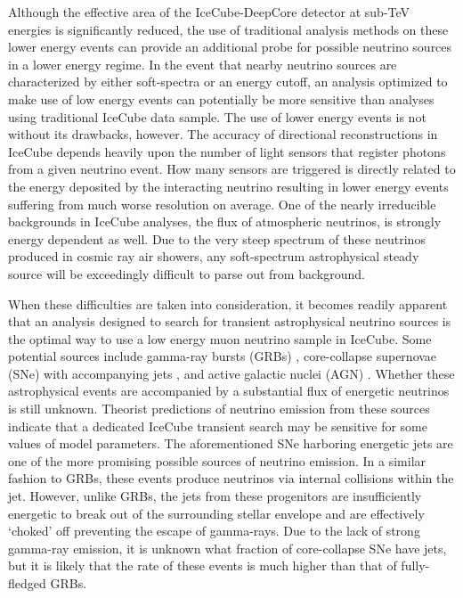 \documentclass{gatech-thesis}
\begin{document}
Although the effective area of the IceCube-DeepCore detector at sub-TeV energies is significantly reduced, the use of traditional analysis methods on these lower energy events can provide an additional probe for possible neutrino sources in a lower energy regime. In the event that nearby neutrino sources are characterized by either soft-spectra or an energy cutoff, an analysis optimized to make use of low energy events can potentially be more sensitive than analyses using traditional IceCube data sample. The use of lower energy events is not without its drawbacks, however. The accuracy of directional reconstructions in IceCube depends heavily upon the number of light sensors that register photons from a given neutrino event. How many sensors are triggered is directly related to the energy deposited by the interacting neutrino resulting in lower energy events suffering from much worse resolution on average. One of the nearly irreducible backgrounds in IceCube analyses, the flux of atmospheric neutrinos, is strongly energy dependent as well. Due to the very steep spectrum of these neutrinos produced in cosmic ray air showers, any soft-spectrum astrophysical steady source will be exceedingly difficult to parse out from background.

When these difficulties are taken into consideration, it becomes readily apparent that an analysis designed to search for transient astrophysical neutrino sources is the optimal way to use a low energy muon neutrino sample in IceCube. Some potential sources include gamma-ray bursts (GRBs) \cite{2014arXiv1410.0679K}, core-collapse supernovae (SNe) with accompanying jets \cite{2004PhRvL..93r1101R}, and active galactic nuclei (AGN) \cite{2009APh....31..138B}. Whether these astrophysical events are accompanied by a substantial flux of energetic neutrinos is still unknown. Theorist predictions of neutrino emission from these sources indicate that a dedicated IceCube transient search may be sensitive for some values of model parameters. The aforementioned SNe harboring energetic jets are one of the more promising possible sources of neutrino emission. In a similar fashion to GRBs, these events produce neutrinos via internal collisions within the jet. However, unlike GRBs, the jets from these progenitors are insufficiently energetic to break out of the surrounding stellar envelope and are effectively `choked' off preventing the escape of gamma-rays. Due to the lack of strong gamma-ray emission, it is unknown what fraction of core-collapse SNe have jets, but it is likely that the rate of these events is much higher than that of fully-fledged GRBs.
\end{document}
